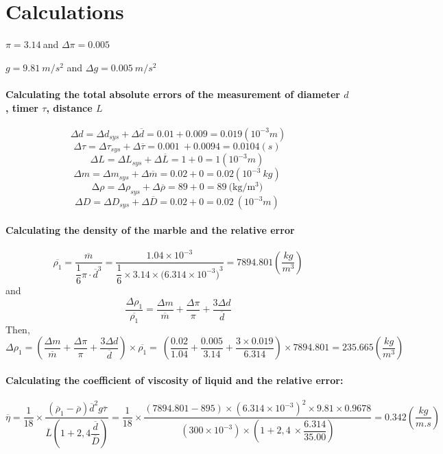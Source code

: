 \section{Calculations}
\noindent $\pi =3.14\ $and $\Delta \pi =0.005$ \par
\noindent $g=9.81\ m/s^2$ and $\Delta g=0.005\ m/s^2$
\paragraph{Calculating the total absolute errors of the measurement of diameter $d$, timer $\tau$, distance $L$}
\[\Delta d=\Delta d_{sys}+\Delta \overline{d}=\mathrm{0.01}+\mathrm{0.009}=0.019\left({10}^{-3}m\right)\] 
\[\Delta \tau =\Delta {\tau }_{sys}+\Delta \overline{\tau }=\mathrm{0.001\ }+\mathrm{0.0094}\mathrm{=0.0104}\left(s\right)\ \] 
\[\Delta L=\Delta L_{sys}+\Delta \overline{L}=1+0=1\left({10}^{-3}m\right)\ \] 
\[\Delta m=\Delta m_{sys}+\Delta \overline{m}=0.02+0=0.02\left({10}^{-3}\ kg\right)\ \] 
\[\mathrm{\Delta }\rho =\Delta {\rho }_{sys}+\Delta \overline{\rho }=89+0=89\ \mathrm{(kg/m^3}\mathrm{)\ }\] 
\[\Delta D=\Delta D_{sys}+\Delta \overline{D}=0.02+0=0.02\ \left({10}^{-3}m\right)\ \] 
\paragraph{Calculating the density of the marble and the relative error}
\[{\overline{\rho_1}}=\dfrac{\overline{m}}{\dfrac{1}{6}\pi \cdot {\overline{d}}^3}=\dfrac{1.04\times {10}^{-3}}{\dfrac{1}{6}\times 3.14\times {\mathrm{(6.314}\times {10}^{-3})}^3}=7894.801(\dfrac{kg}{m^3})\] 
and
\[\dfrac{\Delta {\rho }_1}{{\overline{\rho_1 }}}=\dfrac{\Delta m}{\overline{m}}+\dfrac{\Delta \pi }{\pi }+\dfrac{3\Delta d}{\overline{d}}\]
Then,
\[\Delta {\rho_1}=\left(\dfrac{\Delta m}{\overline{m}}+\dfrac{\Delta \pi }{\pi }+\dfrac{3\Delta d}{\overline{d}}\right)\times {\overline{\rho_1 }}=\ \left(\dfrac{0.02}{1.04}+\dfrac{0.005}{3.14}+\dfrac{3\times 0.019}{\mathrm{6.314}}\right)\times 7894.801=235.665 (\dfrac{kg}{m^3})\]

\paragraph{Calculating the coefficient of viscosity of liquid and the relative error:}
\[\overline{\eta }=\dfrac{1}{18}\times \dfrac{({\overline{\rho }}_1-\overline{\rho }){\overline{d}}^2g\overline{\tau }}{\overline{L}(1+2,4\dfrac{\overline{d}}{\overline{D}})}=\dfrac{1}{18}\times \dfrac{(7894.801-895)\times {\left(6.314\times {10}^{-3}\right)}^2\times 9.81\times 0.9678}{(300\times {10}^{-3})\times (1+2,4\ \times \dfrac{\mathrm{6.314}}{\mathrm{35.00}})}=0.342(\dfrac{kg}{m.s})\]

